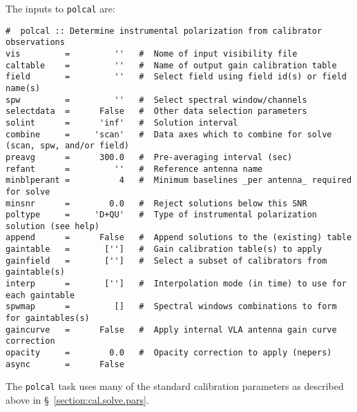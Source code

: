 The inputs to {\tt polcal} are:
\small
\begin{verbatim}
#  polcal :: Determine instrumental polarization from calibrator observations
vis         =         ''   #  Nome of input visibility file
caltable    =         ''   #  Name of output gain calibration table
field       =         ''   #  Select field using field id(s) or field name(s)
spw         =         ''   #  Select spectral window/channels
selectdata  =      False   #  Other data selection parameters
solint      =      'inf'   #  Solution interval
combine     =     'scan'   #  Data axes which to combine for solve (scan, spw, and/or field)
preavg      =      300.0   #  Pre-averaging interval (sec)
refant      =         ''   #  Reference antenna name
minblperant =          4   #  Minimum baselines _per antenna_ required for solve
minsnr      =        0.0   #  Reject solutions below this SNR
poltype     =     'D+QU'   #  Type of instrumental polarization solution (see help)
append      =      False   #  Append solutions to the (existing) table
gaintable   =       ['']   #  Gain calibration table(s) to apply
gainfield   =       ['']   #  Select a subset of calibrators from gaintable(s)
interp      =       ['']   #  Interpolation mode (in time) to use for each gaintable
spwmap      =         []   #  Spectral windows combinations to form for gaintables(s)
gaincurve   =      False   #  Apply internal VLA antenna gain curve correction
opacity     =        0.0   #  Opacity correction to apply (nepers)
async       =      False      
\end{verbatim}
\normalsize
The {\tt polcal} task uses many of the standard calibration parameters
as described above in \S~\ref{section:cal.solve.pars}.

